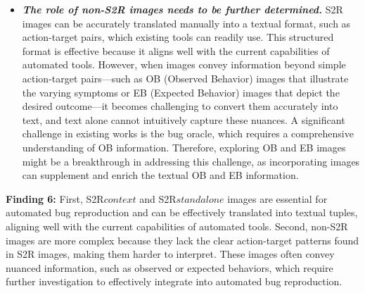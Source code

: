 \begin{itemize}[leftmargin=0.3cm]


\item 
\textbf{\emph{The role of non-S2R images needs to be further determined.}} 
%
S2R images can be accurately translated manually into a textual format, such as action-target pairs, which existing tools can readily use. This structured format is effective because it aligns well with the current capabilities of automated tools. However, when images convey information beyond simple action-target pairs—such as OB (Observed Behavior) images that illustrate the varying symptoms or EB (Expected Behavior) images that depict the desired outcome—it becomes challenging to convert them accurately into text, and text alone cannot intuitively capture these nuances. A significant challenge in existing works is the bug oracle, which requires a comprehensive understanding of OB information. Therefore, exploring OB and EB images might be a breakthrough in addressing this challenge, as incorporating images can supplement and enrich the textual OB and EB information.


\end{itemize}

\begin{tcolorbox}[colback=blue!5, colframe=black, boxrule=0.5pt]

\textbf{Finding 6:} 
First, S2R${context}$ and S2R${standalone}$ images are essential for automated bug reproduction and can be effectively translated into textual tuples, aligning well with the current capabilities of automated tools.
%
Second, non-S2R images are more complex because they lack the clear action-target patterns found in S2R images, making them harder to interpret. These images often convey nuanced information, such as observed or expected behaviors, which require further investigation to effectively integrate into automated bug reproduction.
\end{tcolorbox}